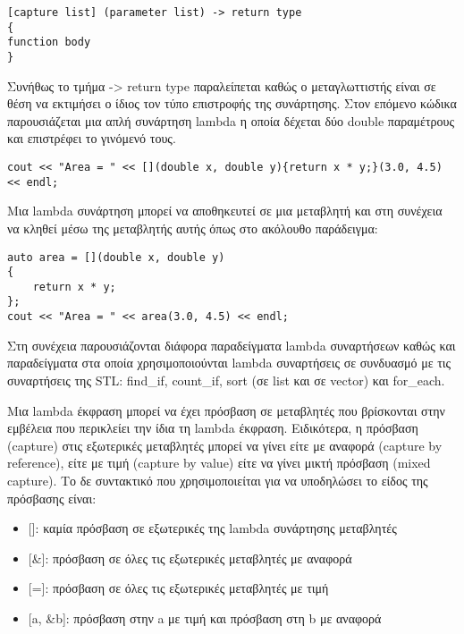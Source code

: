\begin{lstlisting}[style=DOS]
[capture list] (parameter list) -> return type 
{
function body
}
\end{lstlisting}

Συνήθως το τμήμα -> return type παραλείπεται καθώς ο μεταγλωττιστής είναι σε θέση να εκτιμήσει ο ίδιος τον τύπο επιστροφής της συνάρτησης. Στον επόμενο κώδικα παρουσιάζεται μια απλή συνάρτηση lambda η οποία δέχεται δύο double παραμέτρους και επιστρέφει το γινόμενό τους.

\begin{lstlisting}[style=DOS]
cout << "Area = " << [](double x, double y){return x * y;}(3.0, 4.5) << endl;
\end{lstlisting}

Μια lambda συνάρτηση μπορεί να αποθηκευτεί σε μια μεταβλητή και στη συνέχεια να κληθεί μέσω της μεταβλητής αυτής όπως στο ακόλουθο παράδειγμα:

\begin{lstlisting}[style=DOS]
auto area = [](double x, double y)
{
	return x * y;
};
cout << "Area = " << area(3.0, 4.5) << endl;
\end{lstlisting}

Στη συνέχεια παρουσιάζονται διάφορα παραδείγματα lambda συναρτήσεων καθώς και παραδείγματα στα οποία χρησιμοποιούνται lambda συναρτήσεις σε συνδυασμό με τις συναρτήσεις της STL: find\_if, count\_if, sort (σε list και σε vector) και for\_each.





Μια lambda έκφραση μπορεί να έχει πρόσβαση σε μεταβλητές που βρίσκονται στην εμβέλεια που περικλείει την ίδια τη lambda έκφραση. Ειδικότερα, η πρόσβαση (capture) στις εξωτερικές μεταβλητές μπορεί να γίνει είτε με αναφορά (capture by reference), είτε με τιμή (capture by value) είτε να γίνει μικτή πρόσβαση (mixed capture). Το δε συντακτικό που χρησιμοποιείται για να υποδηλώσει το είδος της πρόσβασης είναι:

\begin{itemize}[noitemsep]
\item {[]}: καμία πρόσβαση σε εξωτερικές της lambda συνάρτησης μεταβλητές
\item {[\&]}: πρόσβαση σε όλες τις εξωτερικές μεταβλητές με αναφορά
\item {[=]}: πρόσβαση σε όλες τις εξωτερικές μεταβλητές με τιμή
\item {[a, \&b]}: πρόσβαση στην a με τιμή και πρόσβαση στη b με αναφορά
\end{itemize}

